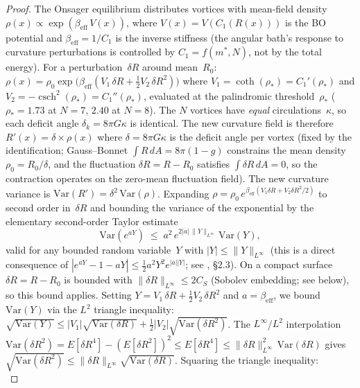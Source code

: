 \begin{proof}
The Onsager equilibrium distributes vortices with mean-field
density $\rho(x) \propto \exp(\beta_{\mathrm{eff}}\,V(x))$,
where $V(x) = V(C_1(R(x)))$ is the BO potential and
$\beta_{\mathrm{eff}} = 1/C_1$ is the inverse stiffness
(the angular bath's response to curvature perturbations is
controlled by $C_1 = f(m^*,N)$, not by the total energy).
For a perturbation~$\delta R$ around mean~$R_0$:
$\rho(x) = \rho_0\exp\!\bigl(\beta_{\mathrm{eff}}
(V_1\,\delta R + \tfrac{1}{2}V_2\,\delta R^2)\bigr)$
where $V_1 = \coth(\rho_*) = C_1'(\rho_*)$ and
$V_2 = -\operatorname{csch}^2(\rho_*) = C_1''(\rho_*)$,
evaluated at the palindromic threshold~$\rho_*$
($\rho_* = 1.73$ at $N = 7$, $2.40$ at $N = 8$).
The $N$ vortices have \emph{equal} circulations~$\kappa$,
so each deficit angle $\delta_k = 8\pi G\kappa$ is identical.
The new curvature field is therefore
$R'(x) = \delta \times \rho(x)$
where $\delta = 8\pi G\kappa$ is the deficit angle per vortex
(fixed by the identification;
Gauss--Bonnet $\int R\,dA = 8\pi(1{-}g)$ constrains
the mean density $\rho_0 = R_0/\delta$, and the
fluctuation $\delta R = R - R_0$ satisfies
$\int \delta R\,dA = 0$, so the contraction
operates on the zero-mean fluctuation field).
The new curvature variance is $\mathrm{Var}(R') = \delta^2\,\mathrm{Var}(\rho)$.
Expanding $\rho = \rho_0\,e^{\beta_{\mathrm{eff}}(V_1\delta R + V_2\delta R^2/2)}$
to second order in~$\delta R$ and bounding the variance of
the exponential by the elementary second-order Taylor estimate
\[
  \mathrm{Var}(e^{aY})
  \;\le\; a^2\,e^{2|a|\,\|Y\|_{L^\infty}}\,\mathrm{Var}(Y),
\]
valid for any bounded random variable~$Y$ with $|Y| \le \|Y\|_{L^\infty}$
(this is a direct consequence of $|e^{aY}-1-aY|\le\tfrac12 a^2 Y^2
e^{|a||Y|}$; see \citealt{BoucheronLugosiMassart2013}, \S2.3).
On a compact surface $\delta R = R - R_0$ is bounded with
$\|\delta R\|_{L^\infty} \le 2C_S$ (Sobolev embedding;
see below), so this bound applies.
Setting $Y = V_1\,\delta R + \tfrac12 V_2\,\delta R^2$
and $a = \beta_{\mathrm{eff}}$, we bound $\mathrm{Var}(Y)$
via the $L^2$ triangle inequality:
$\sqrt{\mathrm{Var}(Y)}
\le |V_1|\sqrt{\mathrm{Var}(\delta R)}
+ \tfrac12 |V_2|\sqrt{\mathrm{Var}(\delta R^2)}$.
The $L^\infty$/$L^2$ interpolation
$\mathrm{Var}(\delta R^2) = E[\delta R^4] - (E[\delta R^2])^2
\le E[\delta R^4] \le \|\delta R\|_{L^\infty}^2\,\mathrm{Var}(\delta R)$
gives
$\sqrt{\mathrm{Var}(\delta R^2)}
\le \|\delta R\|_{L^\infty}\sqrt{\mathrm{Var}(\delta R)}$.
Squaring the triangle inequality:
\begin{equation}\label{eq:var-Y-bound}

\end{equation}
\end{proof}

